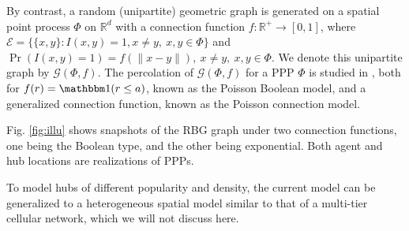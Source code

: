 By contrast, a random (unipartite) geometric graph is generated on a spatial point process $\Phi$ on $\mathbb{R}^d$ with a connection function $f\colon \mathbb{R}^+\to[0,1]$, where $\mathcal{E} = \{\{x,y\}: I(x,y)=1,x\neq y,~x,y\in\Phi\}$ and $\Pr(I(x,y)=1) =  f(\|x-y\|),~x\neq y,~x,y\in\Phi$. 
We denote this unipartite graph by $\mathcal{G}(\Phi,f)$. 
The percolation of $\mathcal{G}(\Phi,f)$ for  a PPP $\Phi$ is studied in \cite[Chapters 3\&6]{MeesterRonald1996CP}, both for $f(r) = \ind (r\leq a)$, known as the Poisson Boolean model, and a generalized connection function, known as the Poisson connection model.
 
 
 Fig. \ref{fig:illu} shows snapshots of the RBG graph under two connection functions, one being the Boolean type, and the other being exponential. Both agent and hub locations are realizations of PPPs. 

  To model hubs of different popularity and density, the current model can be generalized to a heterogeneous spatial model similar to that of a multi-tier cellular network, which we will not discuss here.
  \begin{figure*}[t]
       \centering
     \hfill
       \caption{Illustrating one realization of the RBG graph on $\mathbb{R}^2$, where only its segment in a square window $[-0.5,0.5]^2$ is presented. Hubs are marked with circles, agents with dots, and edges with line segments. Agents without edges are in light gray. In both figures, the density of agents is 100 and the density of hubs is 10; the average number of edges of the typical hub is 5.  }
       \label{fig:illu}
   \end{figure*} 
